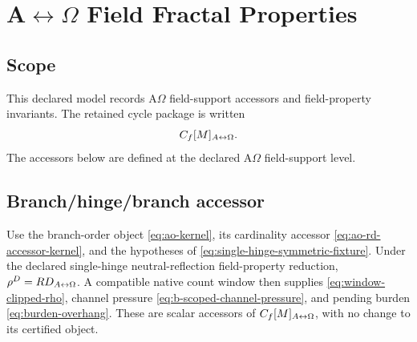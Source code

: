 \section{A\texorpdfstring{\(\leftrightarrow\Omega\)}{<->Omega} Field Fractal Properties}
\label{app:ao-field-fractal-properties}

\subsection{Scope}\label{app:ao-field-fractal-properties:scope}
This declared model records A\(\Omega\) field-support accessors and field-property invariants. The retained cycle package is written
\[
C_f[M]_{A{\leftrightarrow}\Omega}.
\]
The accessors below are defined at the declared A\(\Omega\) field-support level.

\subsection{Branch/hinge/branch accessor}\label{app:ao-field-fractal-properties:accessor}
Use the branch-order object \eqref{eq:ao-kernel}, its cardinality accessor
\eqref{eq:ao-rd-accessor-kernel}, and the hypotheses of
\eqref{eq:single-hinge-symmetric-fixture}.
Under the declared single-hinge neutral-reflection field-property reduction,
\(\rho^D=RD_{A{\leftrightarrow}\Omega}\). A compatible native count window then supplies
\eqref{eq:window-clipped-rho}, channel pressure
\eqref{eq:b-scoped-channel-pressure}, and pending burden
\eqref{eq:burden-overhang}. These are scalar accessors of
\(C_f[M]_{A{\leftrightarrow}\Omega}\), with no change to its certified object.



